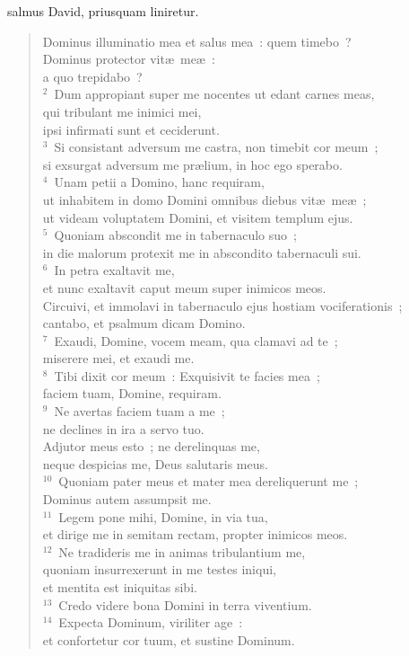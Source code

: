 \bchapter
{}salmus David, priusquam liniretur. \begin{flushleft}\begin{verse}\vspace{6pt}Dominus illuminatio mea et salus mea~: quem timebo~?\\ Dominus protector vit\ae\ me\ae~:\\ a quo trepidabo~?\\
${}^{2}$~Dum appropiant super me nocentes ut edant carnes meas,\\ qui tribulant me inimici mei,\\ ipsi infirmati sunt et ceciderunt.\\
${}^{3}$~Si consistant adversum me castra, non timebit cor meum~;\\ si exsurgat adversum me pr\ae lium, in hoc ego sperabo.\\
${}^{4}$~Unam petii a Domino, hanc requiram,\\ ut inhabitem in domo Domini omnibus diebus vit\ae\ me\ae~;\\ ut videam voluptatem Domini, et visitem templum ejus.\\
${}^{5}$~Quoniam abscondit me in tabernaculo suo~;\\ in die malorum protexit me in abscondito tabernaculi sui.\\
${}^{6}$~In petra exaltavit me,\\ et nunc exaltavit caput meum super inimicos meos.\\ Circuivi, et immolavi in tabernaculo ejus hostiam vociferationis~;\\ cantabo, et psalmum dicam Domino.\\
${}^{7}$~Exaudi, Domine, vocem meam, qua clamavi ad te~;\\ miserere mei, et exaudi me.\\
${}^{8}$~Tibi dixit cor meum~: Exquisivit te facies mea~;\\ faciem tuam, Domine, requiram.\\
${}^{9}$~Ne avertas faciem tuam a me~;\\ ne declines in ira a servo tuo.\\ Adjutor meus esto~; ne derelinquas me,\\ neque despicias me, Deus salutaris meus.\\
${}^{10}$~Quoniam pater meus et mater mea dereliquerunt me~;\\ Dominus autem assumpsit me.\\
${}^{11}$~Legem pone mihi, Domine, in via tua,\\ et dirige me in semitam rectam, propter inimicos meos.\\
${}^{12}$~Ne tradideris me in animas tribulantium me,\\ quoniam insurrexerunt in me testes iniqui,\\ et mentita est iniquitas sibi.\\
${}^{13}$~Credo videre bona Domini in terra viventium.\\
${}^{14}$~Expecta Dominum, viriliter age~:\\ et confortetur cor tuum, et sustine Dominum.\end{verse}\end{flushleft}
